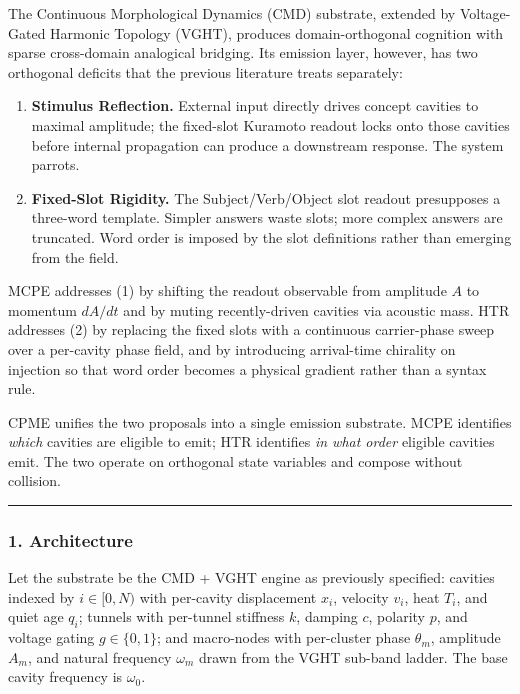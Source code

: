 \documentclass[
  11pt,
  a4paper,
]{article}
\providecommand{\tightlist}{%
  \setlength{\itemsep}{0pt}\setlength{\parskip}{0pt}}
\begin{document}
The Continuous Morphological Dynamics (CMD) substrate, extended by
Voltage-Gated Harmonic Topology (VGHT), produces domain-orthogonal
cognition with sparse cross-domain analogical bridging. Its emission
layer, however, has two orthogonal deficits that the previous literature
treats separately:

\begin{enumerate}
\def\labelenumi{\arabic{enumi}.}
\tightlist
\item
  \textbf{Stimulus Reflection.} External input directly drives concept
  cavities to maximal amplitude; the fixed-slot Kuramoto readout locks
  onto those cavities before internal propagation can produce a
  downstream response. The system parrots.
\item
  \textbf{Fixed-Slot Rigidity.} The Subject/Verb/Object slot readout
  presupposes a three-word template. Simpler answers waste slots; more
  complex answers are truncated. Word order is imposed by the slot
  definitions rather than emerging from the field.
\end{enumerate}

MCPE addresses (1) by shifting the readout observable from amplitude
\(A\) to momentum \(dA/dt\) and by muting recently-driven cavities via
acoustic mass. HTR addresses (2) by replacing the fixed slots with a
continuous carrier-phase sweep over a per-cavity phase field, and by
introducing arrival-time chirality on injection so that word order
becomes a physical gradient rather than a syntax rule.

CPME unifies the two proposals into a single emission substrate. MCPE
identifies \emph{which} cavities are eligible to emit; HTR identifies
\emph{in what order} eligible cavities emit. The two operate on
orthogonal state variables and compose without collision.

\begin{center}\rule{0.5\linewidth}{0.5pt}\end{center}

\subsubsection{1. Architecture}\label{architecture}

Let the substrate be the CMD + VGHT engine as previously specified:
cavities indexed by \(i \in [0, N)\) with per-cavity displacement
\(x_i\), velocity \(v_i\), heat \(T_i\), and quiet age \(q_i\); tunnels
with per-tunnel stiffness \(k\), damping \(c\), polarity \(p\), and
voltage gating \(g \in \{0, 1\}\); and macro-nodes with per-cluster
phase \(\theta_m\), amplitude \(A_m\), and natural frequency
\(\omega_m\) drawn from the VGHT sub-band ladder. The base cavity
frequency is \(\omega_0\).
\end{document}
